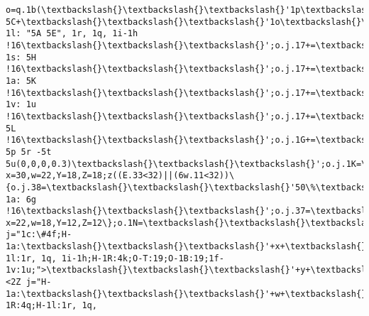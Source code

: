 \documentclass[11pt]{article}
\begin{document}
\begin{Verbatim}[commandchars=\\\{\}]
o=q.1b(\textbackslash{}\textbackslash{}\textbackslash{}'1p\textbackslash{}\textbackslash{}\textbackslash{}'),L=e();o.1m=L;o.j.1g=\textbackslash{}\textbackslash{}\textbackslash{}'2w\textbackslash{}\textbackslash{}\textbackslash{}';o.j.T=p/7+\textbackslash{}\textbackslash{}\textbackslash{}'1o\textbackslash{}\textbackslash{}\textbackslash{}';o.j.5D=Q-5C+\textbackslash{}\textbackslash{}\textbackslash{}'1o\textbackslash{}\textbackslash{}\textbackslash{}';o.j.5B=p/3.5+\textbackslash{}\textbackslash{}\textbackslash{}'1o\textbackslash{}\textbackslash{}\textbackslash{}';o.j.2W=\textbackslash{}\textbackslash{}\textbackslash{}'\#3H\textbackslash{}\textbackslash{}\textbackslash{}';o.j.1T=\textbackslash{}\textbackslash{}\textbackslash{}'2Y\textbackslash{}\textbackslash{}\textbackslash{}';o.j.17+=\textbackslash{}\textbackslash{}\textbackslash{}'H-1l: "5A 5E", 1r, 1q, 1i-1h !16\textbackslash{}\textbackslash{}\textbackslash{}';o.j.17+=\textbackslash{}\textbackslash{}\textbackslash{}'5F-1s: 5H !16\textbackslash{}\textbackslash{}\textbackslash{}';o.j.17+=\textbackslash{}\textbackslash{}\textbackslash{}'H-1a: 5K !16\textbackslash{}\textbackslash{}\textbackslash{}';o.j.17+=\textbackslash{}\textbackslash{}\textbackslash{}'1f-1v: 1u !16\textbackslash{}\textbackslash{}\textbackslash{}';o.j.17+=\textbackslash{}\textbackslash{}\textbackslash{}'1y: 5L !16\textbackslash{}\textbackslash{}\textbackslash{}';o.j.1G+=\textbackslash{}\textbackslash{}\textbackslash{}'1X\textbackslash{}\textbackslash{}\textbackslash{}';o.j.37=\textbackslash{}\textbackslash{}\textbackslash{}'1I\textbackslash{}\textbackslash{}\textbackslash{}';o.j.5a=\textbackslash{}\textbackslash{}\textbackslash{}'1I\textbackslash{}\textbackslash{}\textbackslash{}';o.j.5f=\textbackslash{}\textbackslash{}\textbackslash{}'2t\textbackslash{}\textbackslash{}\textbackslash{}';q.I.1d(o);o.j.5h=\textbackslash{}\textbackslash{}\textbackslash{}'1t 5p 5r -5t 5u(0,0,0,0.3)\textbackslash{}\textbackslash{}\textbackslash{}';o.j.1K=\textbackslash{}\textbackslash{}\textbackslash{}'2L\textbackslash{}\textbackslash{}\textbackslash{}';k x=30,w=22,Y=18,Z=18;z((E.33<32)||(6w.11<32))\{o.j.38=\textbackslash{}\textbackslash{}\textbackslash{}'50\%\textbackslash{}\textbackslash{}\textbackslash{}';o.j.17+=\textbackslash{}\textbackslash{}\textbackslash{}'H-1a: 6g !16\textbackslash{}\textbackslash{}\textbackslash{}';o.j.37=\textbackslash{}\textbackslash{}\textbackslash{}'3M;\textbackslash{}\textbackslash{}\textbackslash{}';i.j.38=\textbackslash{}\textbackslash{}\textbackslash{}'65\%\textbackslash{}\textbackslash{}\textbackslash{}';k x=22,w=18,Y=12,Z=12\};o.1N=\textbackslash{}\textbackslash{}\textbackslash{}'<35 j="1c:\#4f;H-1a:\textbackslash{}\textbackslash{}\textbackslash{}'+x+\textbackslash{}\textbackslash{}\textbackslash{}'1M;1c:\textbackslash{}\textbackslash{}\textbackslash{}'+r+\textbackslash{}\textbackslash{}\textbackslash{}';H-1l:1r, 1q, 1i-1h;H-1R:4k;O-T:19;O-1B:19;1f-1v:1u;">\textbackslash{}\textbackslash{}\textbackslash{}'+y+\textbackslash{}\textbackslash{}\textbackslash{}'</35><2Z j="H-1a:\textbackslash{}\textbackslash{}\textbackslash{}'+w+\textbackslash{}\textbackslash{}\textbackslash{}'1M;H-1R:4q;H-1l:1r, 1q, 
\end{Verbatim}
\end{document}
